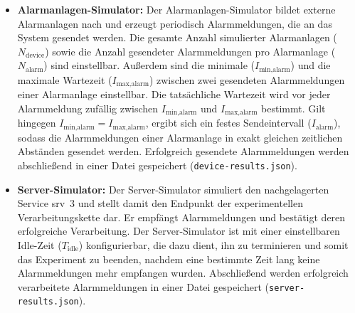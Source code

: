 \begin{itemize}
	\item \textbf{Alarmanlagen-Simulator:} Der Alarmanlagen-Simulator bildet externe Alarmanlagen nach und erzeugt periodisch Alarmmeldungen, die an das System gesendet werden. Die gesamte Anzahl simulierter Alarmanlagen ($N_{\text{device}}$) sowie die Anzahl gesendeter Alarmmeldungen pro Alarmanlage ($N_{\text{alarm}}$) sind einstellbar. Außerdem sind die minimale ($I_{\text{min,alarm}}$) und die maximale Wartezeit ($I_{\text{max,alarm}}$) zwischen zwei gesendeten Alarmmeldungen einer Alarmanlage einstellbar. Die tatsächliche Wartezeit wird vor jeder Alarmmeldung zufällig zwischen $I_{\text{min,alarm}}$ und $I_{\text{max,alarm}}$ bestimmt. Gilt hingegen $I_{\text{min,alarm}} = I_{\text{max,alarm}}$, ergibt sich ein festes Sendeintervall ($I_{\text{alarm}}$), sodass die Alarmmeldungen einer Alarmanlage in exakt gleichen zeitlichen Abständen gesendet werden. Erfolgreich gesendete Alarmmeldungen werden abschließend in einer Datei gespeichert (\texttt{device-results.\allowbreak json}).

	\item \textbf{Server-Simulator:} Der Server-Simulator simuliert den nachgelagerten Service \gls{srv}~3 und stellt damit den Endpunkt der experimentellen Verarbeitungskette dar. Er empfängt Alarmmeldungen und bestätigt deren erfolgreiche Verarbeitung. Der Server-Simulator ist mit einer einstellbaren Idle-Zeit ($T_{\text{idle}}$) konfigurierbar, die dazu dient, ihn zu terminieren und somit das Experiment zu beenden, nachdem eine bestimmte Zeit lang keine Alarmmeldungen mehr empfangen wurden. Abschließend werden erfolgreich verarbeitete Alarmmeldungen in einer Datei gespeichert (\texttt{server-results.\allowbreak json}).

	      \newpage


\end{itemize}
